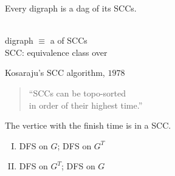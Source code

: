 
\begin{frame}{}
  \begin{theorem}
    Every digraph is a dag of its SCCs.
  \end{theorem}

  \pause
  \vspace{0.60cm}
  \begin{center}
     \\[15pt] 

    digraph $\equiv$ a  of SCCs \\[6pt]

    SCC: equivalence class over 
  \end{center}
\end{frame}

\begin{frame}{}
  \centerline{}

  \vspace{0.50cm}
  \begin{exampleblock}{Kosaraju's SCC algorithm, $1978$}
    \begin{quote}
      \begin{center}
	{\large ``SCCs can be topo-sorted \\[3pt] in  order of their highest  time.''}
      \end{center}
    \end{quote}

    \pause
    \centerline{The vertice with the  finish time is in a  SCC.}
  \end{exampleblock}

  \pause
  \vspace{0.60cm}
  \begin{enumerate}[(I)]
    \centering
      \item DFS on $G$; \; DFS on $G^{T}$ \\[8pt]
      \pause
      \item DFS on $G^{T}$;\; DFS on $G$
  \end{enumerate}
\end{frame}

